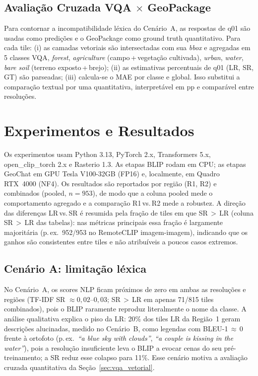 \documentclass[12pt]{article}
\begin{document}
\subsection{Avaliação Cruzada VQA $\times$ GeoPackage}
\label{sec:vqa_vetorial_met}

Para contornar a incompatibilidade léxica do Cenário~A, as respostas de
q01 são usadas como predições e o GeoPackage como ground truth
quantitativo. Para cada tile: (i) as camadas vetoriais são intersectadas
com sua \textit{bbox} e agregadas em 5 classes VQA, \textit{forest},
\textit{agriculture} (campo\,+\,vegetação cultivada), \textit{urban},
\textit{water}, \textit{bare soil} (terreno exposto\,+\,brejo); (ii) as
estimativas percentuais de q01 (LR, SR, GT) são parseadas; (iii) calcula-se
o MAE por classe e global. Isso substitui a comparação textual por uma
quantitativa, interpretável em pp e comparável entre resoluções.


\section{Experimentos e Resultados}

Os experimentos usam Python 3.13, PyTorch 2.x, Transformers 5.x,
open\_clip\_torch 2.x e Rasterio 1.3. As etapas BLIP rodam em CPU; as
etapas GeoChat em GPU Tesla V100-32GB (FP16) e, localmente, em Quadro
RTX~4000 (NF4). Os resultados são reportados por região (R1, R2) e
combinados (pooled, $n=953$), de modo que a coluna pooled mede o
comportamento agregado e a comparação R1\,vs.\,R2 mede a robustez.
A direção das diferenças LR\,vs.\,SR é resumida pela fração de tiles em
que SR\,$>$\,LR (coluna SR\,$>$\,LR das tabelas): nas métricas principais
essa fração é largamente majoritária (p.\,ex.\ 952/953 no RemoteCLIP
imagem-imagem), indicando que os ganhos são consistentes entre tiles e
não atribuíveis a poucos casos extremos.

\subsection{Cenário A: limitação léxica}

No Cenário~A, os scores NLP ficam próximos de zero em ambas as resoluções
e regiões (TF-IDF SR $\approx 0{,}02$--$0{,}03$; SR\,$>$\,LR em apenas
71/815 tiles combinados), pois o BLIP raramente reproduz literalmente o
nome da classe. A análise qualitativa explica o piso da LR: 20\% dos tiles
LR da Região~1 geram descrições alucinadas, medido no Cenário~B, como
legendas com BLEU-1\,$\approx$\,0 frente à ortofoto (p.\,ex.\ \textit{``a
blue sky with clouds''}, \textit{``a couple is kissing in the water''}),
pois a resolução insuficiente leva o BLIP a evocar cenas do seu
pré-treinamento; a SR reduz esse colapso para 11\%. Esse cenário motiva a avaliação cruzada
quantitativa da Seção~\ref{sec:vqa_vetorial}.
\end{document}
